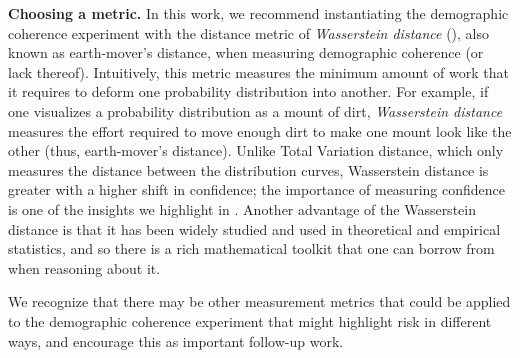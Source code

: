 \medskip\noindent
\textbf{Choosing a metric.} In this work, we recommend instantiating the demographic coherence experiment with the distance metric of \emph{Wasserstein distance} (),
also known as earth-mover's distance, when measuring demographic coherence (or lack thereof).  Intuitively, this metric measures the minimum amount of work that it requires to deform one probability distribution into another.  For example, if one visualizes a probability distribution as a mount of dirt, \emph{Wasserstein distance} measures the effort required to move enough dirt to make one mount look like the other (thus, earth-mover's distance). Unlike Total Variation distance, which only measures the distance between the distribution curves, Wasserstein distance is greater with a higher shift in confidence; the importance of measuring confidence is one of the insights we highlight in . Another advantage of the Wasserstein distance is that it has been widely studied and used in theoretical and empirical statistics, and so there is a rich mathematical toolkit that one can borrow from when reasoning about it. 

We recognize that there may be other measurement metrics that could be applied to the demographic coherence experiment that might highlight risk in different ways, and encourage this as important follow-up work.

